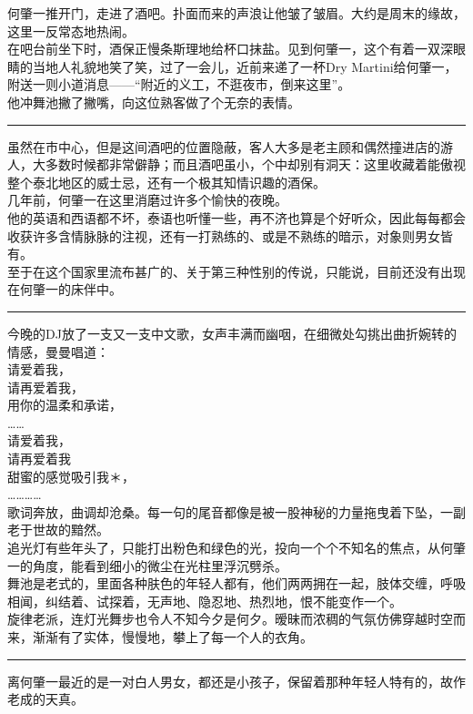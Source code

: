 \documentclass[oneside,11pt]{memoir} %
\begin{document}
\begin{CJK}{UTF8}{gbsn}
何肇一推开门，走进了酒吧。扑面而来的声浪让他皱了皱眉。大约是周末的缘故，这里一反常态地热闹。\\\indent
在吧台前坐下时，酒保正慢条斯理地给杯口抹盐。见到何肇一，这个有着一双深眼睛的当地人礼貌地笑了笑，过了一会儿，近前来递了一杯Dry Martini给何肇一，附送一则小道消息——“附近的义工，不逛夜市，倒来这里”。\\\indent
他冲舞池撇了撇嘴，向这位熟客做了个无奈的表情。\\\indent
\rule{-3pt}{30pt}
虽然在市中心，但是这间酒吧的位置隐蔽，客人大多是老主顾和偶然撞进店的游人，大多数时候都非常僻静；而且酒吧虽小，个中却别有洞天：这里收藏着能傲视整个泰北地区的威士忌，还有一个极其知情识趣的酒保。\\\indent
几年前，何肇一在这里消磨过许多个愉快的夜晚。\\\indent
他的英语和西语都不坏，泰语也听懂一些，再不济也算是个好听众，因此每每都会收获许多含情脉脉的注视，还有一打熟练的、或是不熟练的暗示，对象则男女皆有。\\\indent
至于在这个国家里流布甚广的、关于第三种性别的传说，只能说，目前还没有出现在何肇一的床伴中。\\\indent
\rule{-3pt}{30pt}
今晚的DJ放了一支又一支中文歌，女声丰满而幽咽，在细微处勾挑出曲折婉转的情感，曼曼唱道：\\\indent
    请爱着我，\\\indent
    请再爱着我，\\\indent
    用你的温柔和承诺，\\\indent
    ……\\\indent
    请爱着我，\\\indent
    请再爱着我\\\indent
    甜蜜的感觉吸引我＊，\\\indent
     …………\\\indent
    歌词奔放，曲调却沧桑。每一句的尾音都像是被一股神秘的力量拖曳着下坠，一副老于世故的黯然。\\\indent
追光灯有些年头了，只能打出粉色和绿色的光，投向一个个不知名的焦点，从何肇一的角度，能看到细小的微尘在光柱里浮沉劈杀。\\\indent   
舞池是老式的，里面各种肤色的年轻人都有，他们两两拥在一起，肢体交缠，呼吸相闻，纠结着、试探着，无声地、隐忍地、热烈地，恨不能变作一个。\\\indent 
    旋律老派，连灯光舞步也令人不知今夕是何夕。暧昧而浓稠的气氛仿佛穿越时空而来，渐渐有了实体，慢慢地，攀上了每一个人的衣角。\\\indent 
\rule{-3pt}{30pt}
    离何肇一最近的是一对白人男女，都还是小孩子，保留着那种年轻人特有的，故作老成的天真。\\\indent 

\end{CJK}
\end{document}
